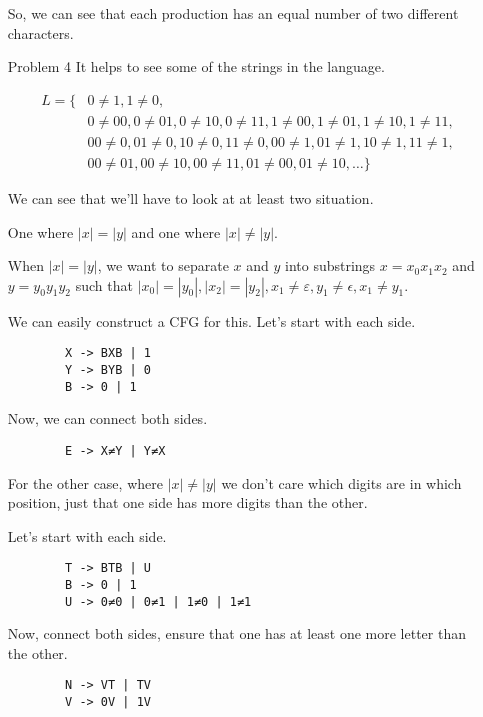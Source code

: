 \documentclass[12pt,letterpaper]{article}
\begin{document}
\begin{enumerate}
      So, we can see that each production has an equal number of two different characters.

    \pagebreak

    \item[Problem 4]
      It helps to see some of the strings in the language.

      \begin{align*}
        L = \{& 0\ne1, 1\ne0, \\
        & 0\ne00, 0\ne01, 0\ne10, 0\ne11, 1\ne00, 1\ne01, 1\ne10, 1\ne11, \\
        & 00\ne0, 01\ne0, 10\ne0, 11\ne0, 00\ne1, 01\ne1, 10\ne1, 11\ne1, \\
        & 00\ne01, 00\ne10, 00\ne11, 01\ne00, 01\ne10, \dots\}
      \end{align*}

      We can see that we'll have to look at at least two situation.

      One where $|x| = |y|$ and one where $|x| \ne |y|$.

      When $|x| = |y|$, we want to separate $x$ and $y$ into substrings $x = x_0x_1x_2$ and $y = y_0y_1y_2$ such that $|x_0| = |y_0|, |x_2| = |y_2|, x_1 \ne \varepsilon, y_1 \ne \epsilon, x_1 \ne y_1$.

      We can easily construct a CFG for this.
      Let's start with each side.

      \begin{lstlisting}
        X -> BXB | 1
        Y -> BYB | 0
        B -> 0 | 1
      \end{lstlisting}

      Now, we can connect both sides.

      \begin{lstlisting}
        E -> X≠Y | Y≠X
      \end{lstlisting}

      For the other case, where $|x| \ne |y|$ we don't care which digits are in which position, just that one side has more digits than the other.

      Let's start with each side.

      \begin{lstlisting}
        T -> BTB | U
        B -> 0 | 1
        U -> 0≠0 | 0≠1 | 1≠0 | 1≠1
      \end{lstlisting}

      Now, connect both sides, ensure that one has at least one more letter than the other.

      \begin{lstlisting}
        N -> VT | TV
        V -> 0V | 1V
      \end{lstlisting}


\end{enumerate}
\end{document}
